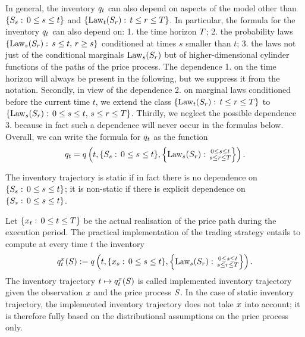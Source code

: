\documentclass[10pt,a4paper]{article}
\begin{document}
In general, the inventory $q_t$ can also  depend on aspects of the model other than  $\lbrace S_s:\, 0\leq s\leq t\rbrace$ and $\lbrace \text{Law}_t (S_r): \, t\leq r\leq T\rbrace$. In particular, the formula for the inventory  $q_t$ can  also depend  on: 1. the time horizon $T$; 2. the probability laws $\lbrace \text{Law}_s (S_r): \, s\leq t, \,  r\geq s\rbrace$ conditioned at times $s$ smaller than $t$; 3. the laws not just of the conditional marginals $\text{Law}_s (S_r)$ but  of  higher-dimensional cylinder functions of the paths of the price process. The dependence 1. on the time horizon will always be present in the following, but we suppress it from the notation. Secondly,  in view of the dependence 2. on marginal laws conditioned before the current time $t$, we extend the class 	$\lbrace \text{Law}_t (S_r): \, t\leq r\leq T\rbrace$ to	$\lbrace \text{Law}_s (S_r): \, 0\leq s\leq t, \, s\leq r\leq T\rbrace$. Thirdly,  we neglect the possible dependence 3. because in fact such a dependence will never occur in the formulas below. Overall, we can write the formula for  $q_t$  as the function 
\begin{equation}	\label{eq.inventoryAsFunctionOfPriceProcess}
q_t = q \left(  t, \lbrace S_s:\, 0\leq s\leq t\rbrace, \left\lbrace \text{Law}_s (S_r): \, \substack{0\leq s \leq t \\s\leq r\leq T}\right \rbrace \right).
\end{equation}

The inventory trajectory is static if in fact there is no dependence on  $\lbrace S_s:\, 0\leq s\leq t\rbrace$; it is non-static if there is explicit dependence on  $\lbrace S_s:\, 0\leq s\leq t\rbrace$.

Let $\lbrace x_t : \, 0\leq t\leq T \rbrace$ be the actual realisation of the price path during the execution period. The practical implementation of the trading strategy entails to compute at every time $t$ the inventory 
\begin{equation}\label{eq.implementedInventory}
q^{x}_t (S) 
:= q\left(t,
\lbrace x_s : \, 0\leq s\leq t \rbrace,
\left\lbrace \text{Law}_s (S_r): \, \substack{0\leq s \leq t \\s\leq r\leq T} \right\rbrace
\right).
\end{equation}
The inventory trajectory $t\mapsto q^{x}_t(S)$ is called implemented inventory trajectory given the observation $x$ and the price process $S$. In the case of static inventory trajectory, the implemented inventory trajectory does not take $x$ into account; it is therefore fully based on the distributional assumptions on the price process only. 
\end{document}
